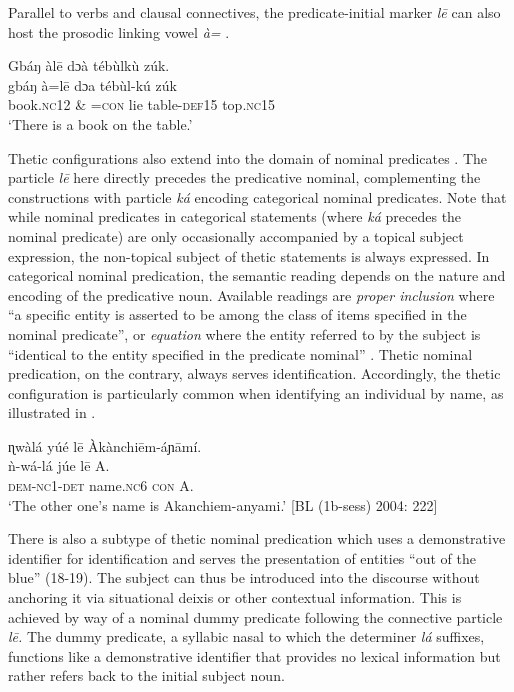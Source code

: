 \documentclass[output=paper]{langsci/langscibook}
\begin{document}
Parallel to verbs and clausal connectives, the predicate-initial marker \textit{l\={e}} can also host the prosodic linking vowel \textit{à}\textit{=} .

\ea
\glll \textup{}  Gbáŋ    àl\={e}    dɔà  tébùlkù    zúk.\\
  \textup{  gbáŋ    à=l\={e}    dɔa  tébùl-kú  zúk}\\
       book.\textsc{nc}12   \& =\textsc{con}  lie  table-\textsc{def}15  top.\textsc{nc}15\\
\glt ‘There is a book on the table.’ \citep[271]{Schwarz2009}
\z

Thetic configurations also extend into the domain of nominal predicates . The particle \textit{l\={e}} here directly precedes the predicative nominal, complementing the constructions with particle \textit{ká} encoding categorical nominal predicates. Note that while nominal predicates in categorical statements (where \textit{ká} precedes the nominal predicate) are only occasionally accompanied by a topical subject expression, the non-topical subject of thetic statements is always expressed. In categorical nominal predication, the semantic reading depends on the nature and encoding of the predicative noun. Available readings are \textit{proper inclusion} where “a specific entity is asserted to be among the class of items specified in the nominal predicate”, or \textit{equation} where the entity referred to by the subject is “identical to the entity specified in the predicate nominal” \citep[114]{Payne1997}. Thetic nominal predication, on the contrary, always serves identification. Accordingly, the thetic configuration is particularly common when identifying an individual by name, as illustrated in .

\ea
\glll \textup{}  ɳwàlá     yúé    l\={e}   Àkànchi\={e}m-áɲ\={a}mí.\\
  \textup{  ǹ}\textup{-wá-lá   júe    l\={e}   A.}\\
     \textsc{ } \textsc{dem}-\textsc{nc}1-\textsc{det } name\textsc{.nc}6  \textsc{con}  A.\\
\glt ‘The other one’s name is Akanchiem-anyami.’ [BL (1b-sess) 2004: 222]
\z

There is also a subtype of thetic nominal predication which uses a demonstrative identifier for identification and serves the presentation of entities “out of the blue” (18-19). The subject can thus be introduced into the discourse without anchoring it via situational deixis or other contextual information. This is achieved by way of a nominal dummy predicate following the connective particle \textit{l\={e}.} The dummy predicate, a syllabic nasal to which the determiner \textit{lá} suffixes, functions like a demonstrative identifier that provides no lexical information but rather refers back to the initial subject noun.
\end{document}
